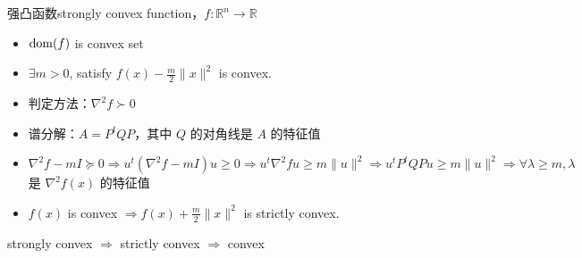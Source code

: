 \begin{remark}
    强凸函数strongly convex function，$f:\mathbb{R}^n \to \mathbb{R}$
    \begin{itemize}
        \item $\operatorname{dom}(f)$ is convex set
        \item $\exists m > 0$, satisfy $f(x) - \frac{m}{2}\|x\|^2$ is convex.
        \item 判定方法：$\nabla^2f \succ 0$
        \item 谱分解：$A = P^tQP$，其中 $Q$ 的对角线是 $A$ 的特征值
        \item $\nabla^2f - mI \succeq 0 \Longrightarrow u^t(\nabla^2f - mI)u \ge 0 \Longrightarrow u^t\nabla^2f u \ge m\|u\|^2  \Longrightarrow u^t P^tQP u \ge m\|u\|^2 \Longrightarrow \forall \lambda \ge m, \lambda$ 是 $\nabla^2f(x)$ 的特征值
        \item $f(x)$ is convex $\Longrightarrow f(x) + \frac{m}{2}\|x\|^2$ is strictly convex.
    \end{itemize}
    strongly convex $\Longrightarrow$ strictly convex $\Longrightarrow$ convex
\end{remark}

